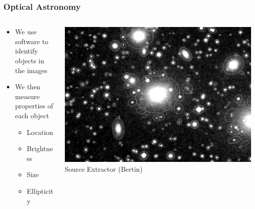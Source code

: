 \documentclass{beamer}
\begin{document}
\frame
{

    \frametitle{Optical Astronomy}


    \begin{columns}
        \begin{column}{0.5\textwidth}
            \begin{itemize}


                \item We use software to identify objects in the images

                \item We then measure properties of each object

                    \begin{itemize}
                        \item Location
                        \item Brightness
                        \item Size
                        \item Ellipticity
                    \end{itemize}

            \end{itemize}
        \end{column}
        \begin{column}{0.5\textwidth}
            \begin{center}
                \includegraphics[width=\textwidth]{sun226_fig.png}
                \newline
                {\tiny Source Extractor (Bertin)}
            \end{center}

            
        \end{column}
    \end{columns}


}
\end{document}
